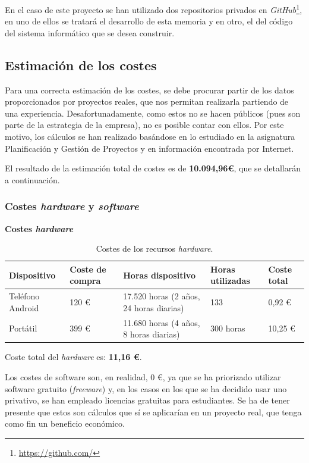 \documentclass[twoside]{report}
\begin{document}
En el caso de este proyecto se han utilizado dos repositorios privados en \textit{GitHub}\footnote{\url{https://github.com/}}, en uno de ellos se tratará el desarrollo de esta memoria y en otro, el del código del sistema informático que se desea construir.

\subsection{Estimación de los costes}

Para una correcta estimación de los costes, se debe procurar partir de los datos proporcionados por proyectos reales, que nos permitan realizarla partiendo de una experiencia. Desafortunadamente, como estos no se hacen públicos (pues son parte de la estrategia de la empresa), no es posible contar con ellos. Por este motivo, los cálculos se han realizado basándose en lo estudiado en la asignatura Planificación y Gestión de Proyectos \cite{pgptema2} y en información encontrada por Internet.

El resultado de la estimación total de costes es de \textbf{10.094,96\euro}, que se detallarán a continuación.

\subsubsection{Costes \textit{hardware} y \textit{software}}
\textbf{Costes \textit{hardware}}
\begin{table}[H]
\center
\begin{tabular}{|l|l|l|l|l|}
\hline
Dispositivo        & Coste de compra   & Horas dispositivo & Horas utilizadas & Coste total \\ \hline
Teléfono Android   & 120 \euro      & 17.520 horas (2 años, 24 horas diarias)  & 133  & 0,92  \euro \\ \hline
Portátil      & 399 \euro   &  11.680 horas (4 años, 8 horas diarias) & 300 horas  & 10,25 \euro \\ \hline
\end{tabular}
\caption{Costes de los recursos \textit{hardware}.}
\end{table}

Coste total del \textit{hardware} es: \textbf{11,16 \euro}.

Los costes de software son, en realidad, 0 \euro, ya que se ha priorizado utilizar software gratuito (\textit{freeware}) y,  en los casos en los que se ha decidido usar uno privativo, se han empleado licencias gratuitas para estudiantes. Se ha de tener presente que estos son cálculos que sí se aplicarían en un proyecto real, que tenga como fin un beneficio económico.
\end{document}
